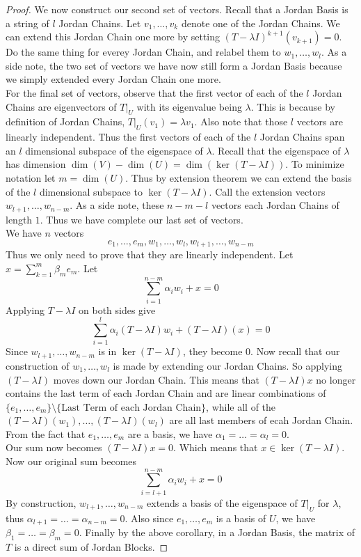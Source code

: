\documentclass[a4paper]{article}
\begin{document}
\begin{thm}{}{}
\begin{proof}
We now construct our second set of vectors. Recall that a Jordan Basis is a string of $l$ Jordan Chains. Let $v_1,\dots,v_k$ denote one of the Jordan Chains. We can extend this Jordan Chain one more by setting $(T-\lambda I)^{k+1}(v_{k+1})=0$. Do the same thing for everey Jordan Chain, and relabel them to $w_1,\dots,w_l$. As a side note, the two set of vectors we have now still form a Jordan Basis because we simply extended every Jordan Chain one more. \\
For the final set of vectors, observe that the first vector of each of the $l$ Jordan Chains are eigenvectors of $T|_U$ with its eigenvalue being $\lambda$. This is because by definition of Jordan Chains, $T|_U(v_1)=\lambda v_1$. Also note that those $l$ vectors are linearly independent. Thus the first vectors of each of the $l$ Jordan Chains span an $l$ dimensional subspace of the eigenspace of $\lambda$. Recall that the eigenspace of $\lambda$ has dimension $\dim(V)-\dim(U)=\dim(\ker(T-\lambda I))$. To minimize notation let $m=\dim(U)$. Thus by extension theorem we can extend the basis of the $l$ dimensional subspace to $\ker(T-\lambda I)$. Call the extension vectors $w_{l+1},\dots,w_{n-m}$. As a side note, these $n-m-l$ vectors each Jordan Chains of length $1$. Thus we have complete our last set of vectors. \\
We have $n$ vectors $$e_1,\dots,e_m,w_1,\dots,w_l,w_{l+1},\dots,w_{n-m}$$ Thus we only need to prove that they are linearly independent. Let $x=\sum_{k=1}^m\beta_me_m$. Let $$\sum_{i=1}^{n-m}\alpha_iw_i+x=0$$ Applying $T-\lambda I$ on both sides give $$\sum_{i=1}^{l}\alpha_i(T-\lambda I)w_i+(T-\lambda I)(x)=0$$ Since $w_{l+1},\dots,w_{n-m}$ is in $\ker(T-\lambda I)$, they become $0$. Now recall that our construction of $w_1,\dots,w_l$ is made by extending our Jordan Chains. So applying $(T-\lambda I)$ moves down our Jordan Chain. This means that $(T-\lambda I)x$ no longer contains the last term of each Jordan Chain and are linear combinations of $\{e_1,\dots,e_m\}\setminus\{\text{Last Term of each Jordan Chain}\}$, while all of the $(T-\lambda I)(w_1),\dots,(T-\lambda I)(w_l)$ are all last members of ecah Jordan Chain. From the fact that $e_1,\dots,e_m$ are a basis, we have $\alpha_1=\dots=\alpha_l=0$. \\
Our sum now becomes $(T-\lambda I)x=0$. Which means that $x\in\ker(T-\lambda I)$. Now our original sum becomes $$\sum_{i=l+1}^{n-m}\alpha_iw_i+x=0$$ By construction, $w_{l+1},\dots,w_{n-m}$ extends a basis of the eigenspace of $T|_U$ for $\lambda$, thus $\alpha_{l+1}=\dots=\alpha_{n-m}=0$. Also since $e_1,\dots,e_m$ is a basis of $U$, we have $\beta_1=\dots=\beta_m=0$. 
Finally by the above corollary, in a Jordan Basis, the matrix of $T$ is a direct sum of Jordan Blocks. 
\end{proof}
\end{thm}
\end{document}
